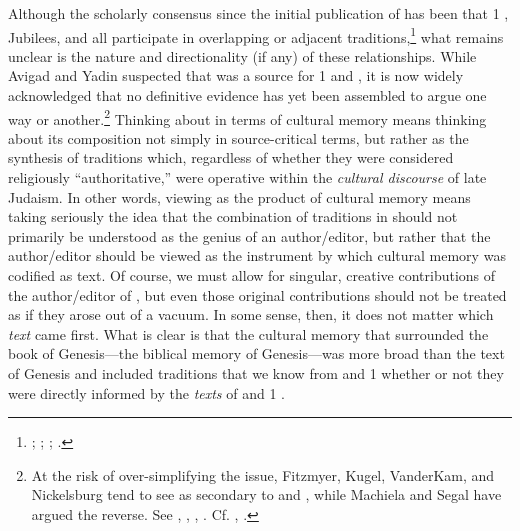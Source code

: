 Although the scholarly consensus since the initial publication of \ga has been that 1 \enoch, Jubilees, and \ga all participate in overlapping or adjacent traditions,\footnote{\cite[38]{avigad-yadin1956}; \cite[20--22]{fitzmyer2004}; \cite[110--116]{crawford2008}; \cite[8--19]{machiela2009}.} what remains unclear is the nature and directionality (if any) of these relationships. While Avigad and Yadin suspected that \ga was a source for 1 \enoch and \jub,\autocite[38]{avigad-yadin1956} it is now widely acknowledged that no definitive evidence has yet been assembled to argue one way or another.\footnote{At the risk of over-simplifying the issue, Fitzmyer, Kugel, VanderKam, and Nickelsburg tend to see \ga as secondary to \jub and \ga, while Machiela and Segal have argued the reverse. See \cite{vanderkam_feldman-etal2017}, \cite[]{fitzmyer2004}, \cite[174]{nickelsburg2005}, \cite[305--342]{kugel2012}. Cf. \cite{segal_as2010}, \cite[140--142]{machiela2009}.} Thinking about \ga in terms of cultural memory means thinking about its composition not simply in source-critical terms, but rather as the synthesis of traditions which, regardless of whether they were considered religiously ``authoritative,'' were operative within the \emph{cultural discourse} of late \secondtemple Judaism. In other words, viewing \ga as the product of cultural memory means taking seriously the idea that the combination of traditions in \ga should not primarily be understood as the genius of an author/editor, but rather that the author/editor should be viewed as the instrument by which cultural memory was codified as text. Of course, we must allow for singular, creative contributions of the author/editor of \ga, but even those original contributions should not be treated as if they arose out of a vacuum. In some sense, then, it does not matter which \emph{text} came first. What is clear is that the cultural memory that surrounded the book of Genesis---the biblical memory of Genesis---was more broad than  the text of Genesis and included traditions that we know from \jub and 1 \enoch whether or not they were directly informed by the \emph{texts} of \jub and 1 \enoch.



